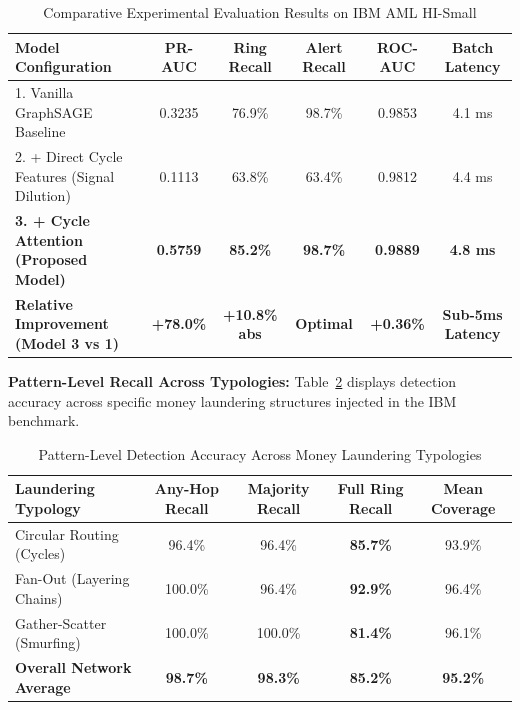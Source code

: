 \documentclass[11pt, a4paper]{article}
\begin{document}
\begin{table}[H]
    \centering
    \footnotesize
    \renewcommand{\arraystretch}{1.20}
    \begin{tabular}{|p{5.2cm}|c|c|c|c|c|}
        \hline
        \textbf{Model Configuration} & \textbf{PR-AUC} & \textbf{Ring Recall} & \textbf{Alert Recall} & \textbf{ROC-AUC} & \textbf{Batch Latency} \\
        \hline
        1. Vanilla GraphSAGE Baseline & 0.3235 & 76.9\% & 98.7\% & 0.9853 & 4.1 ms \\
        \hline
        2. + Direct Cycle Features (Signal Dilution) & 0.1113 & 63.8\% & 63.4\% & 0.9812 & 4.4 ms \\
        \hline
        \textbf{3. + Cycle Attention (Proposed Model)} & \textbf{0.5759} & \textbf{85.2\%} & \textbf{98.7\%} & \textbf{0.9889} & \textbf{4.8 ms} \\
        \hline
        \textbf{Relative Improvement (Model 3 vs 1)} & \textbf{+78.0\%} & \textbf{+10.8\% abs} & \textbf{Optimal} & \textbf{+0.36\%} & \textbf{Sub-5ms Latency} \\
        \hline
    \end{tabular}
    \caption{Comparative Experimental Evaluation Results on IBM AML HI-Small}
    \label{tab:ablation_results}
\end{table}

\noindent
\textbf{Pattern-Level Recall Across Typologies:} Table~\ref{tab:typologies} displays detection accuracy across specific money laundering structures injected in the IBM benchmark.
\begin{table}[H]
    \centering
    \footnotesize
    \renewcommand{\arraystretch}{1.15}
    \begin{tabular}{|l|c|c|c|c|}
        \hline
        \textbf{Laundering Typology} & \textbf{Any-Hop Recall} & \textbf{Majority Recall} & \textbf{Full Ring Recall} & \textbf{Mean Coverage} \\
        \hline
        Circular Routing (Cycles) & 96.4\% & 96.4\% & \textbf{85.7\%} & 93.9\% \\
        \hline
        Fan-Out (Layering Chains) & 100.0\% & 96.4\% & \textbf{92.9\%} & 96.4\% \\
        \hline
        Gather-Scatter (Smurfing) & 100.0\% & 100.0\% & \textbf{81.4\%} & 96.1\% \\
        \hline
        \textbf{Overall Network Average} & \textbf{98.7\%} & \textbf{98.3\%} & \textbf{85.2\%} & \textbf{95.2\%} \\
        \hline
    \end{tabular}
    \caption{Pattern-Level Detection Accuracy Across Money Laundering Typologies}
    \label{tab:typologies}
\end{table}
\end{document}
